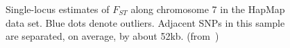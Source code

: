 \begin{figure}
\begin{center}
\end{center}
\caption{Single-locus estimates of $F_{ST}$ along chromosome 7 in the
  HapMap data set. Blue dots denote outliers. Adjacent SNPs in this
  sample are separated, on average, by about
  52kb. (from~\cite{Guo-etal-2009})}\label{fig:low-res-SNP}
\end{figure}

